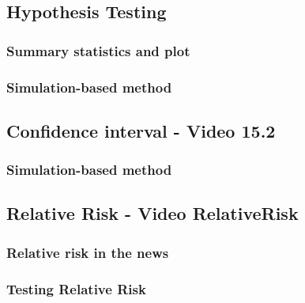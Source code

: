 \documentclass[
]{report}
\begin{document}
\subsection*{Hypothesis Testing}\label{hypothesis-testing-3}

\subsubsection*{Summary statistics and plot}\label{summary-statistics-and-plot}

\subsubsection*{Simulation-based method}\label{simulation-based-method-4}

\subsection*{Confidence interval - Video 15.2}\label{confidence-interval---video-15.2}

\subsubsection*{Simulation-based method}\label{simulation-based-method-5}

\subsection*{Relative Risk - Video RelativeRisk}\label{relative-risk---video-relativerisk}

\subsubsection*{Relative risk in the news}\label{relative-risk-in-the-news}

\subsubsection*{Testing Relative Risk}\label{testing-relative-risk}
\end{document}
